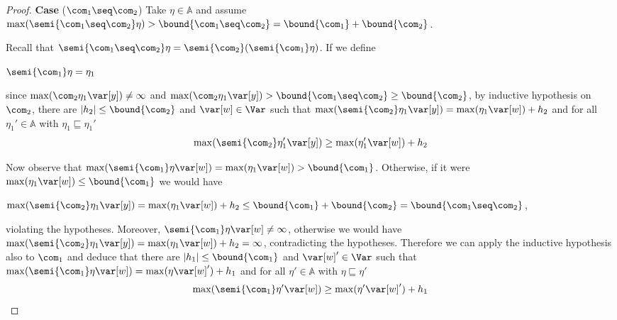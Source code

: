 \begin{proof}
  \medskip
  
  \noindent
  \textbf{Case} (\(\com_1 \seq \com_2\))
  Take \(\eta \in \mathbb{A}\) and assume
  \(\max(\semi{\com_1 \seq \com_2}\eta) > \bound{\com_1 \seq \com_2} =
  \bound{\com_1} + \bound{\com_2}\).
  
  Recall that
  \(\semi{\com_1 \seq \com_2} \eta = \semi{\com_2}(\semi{\com_1}\eta)\).
  If we define
  \begin{center}
    \(\semi{\com_1} \eta = \eta_1\)
  \end{center}
  since \(\max(\com_2 \eta_1 \var[y]) \neq \infty\) and 
  \(\max(\com_2 \eta_1 \var[y]) > \bound{\com_1 \seq \com_2} \geq
  \bound{\com_2}\), by inductive hypothesis on \(\com_2\), there are
  \(|h_2| \leq \bound{\com_2}\) and \(\var[w] \in \Var\) such that
  \(\max(\semi{\com_2} \eta_1 \var[y]) = \max(\eta_1 \var[w]) + h_2\) and
  for all \(\eta_1' \in \mathbb{A}\) with \(\eta_1 \sqsubseteq \eta_1'\)
  \begin{equation}
    \label{eq:seq2}
    \max(\semi{\com_2} \eta_1' \var[y]) \geq \max(\eta_1' \var[w]) + h_2
  \end{equation}
  
  Now observe that
  \(\max(\semi{\com_1}\eta \var[w]) = \max(\eta_1 \var[w]) >
  \bound{\com_1}\). Otherwise, if it were \(\max(\eta_1 \var[w]) \leq
  \bound{\com_1}\) we would have
  \begin{center}
    \(\max(\semi{\com_2}\eta_1 \var[y]) = \max(\eta_1 \var[w]) + h_2 \leq
    \bound{\com_1} + \bound{\com_2} = \bound{\com_1 \seq \com_2}\),
  \end{center}
  violating the hypotheses. Moreover,
  \(\semi{\com_1}\eta \var[w] \neq \infty\), otherwise we would have
  \(\max(\semi{\com_2} \eta_1 \var[y]) = \max(\eta_1 \var[w]) + h_2 =
  \infty\), contradicting the hypotheses.  Therefore we can apply the
  inductive hypothesis also to \(\com_1\) and deduce that there are
  \(|h_1| \leq \bound{\com_1}\) and \(\var[w]' \in \Var\) such that
  \(\max(\semi{\com_1} \eta \var[w]) = \max(\eta \var[w]') + h_1\) and
  for all \(\eta' \in \mathbb{A}\) with \(\eta \sqsubseteq \eta'\)
  \begin{equation}
    \label{eq:seq1}
    \max(\semi{\com_1} \eta' \var[w]) \geq \max(\eta' \var[w]') + h_1
  \end{equation}


\end{proof}
